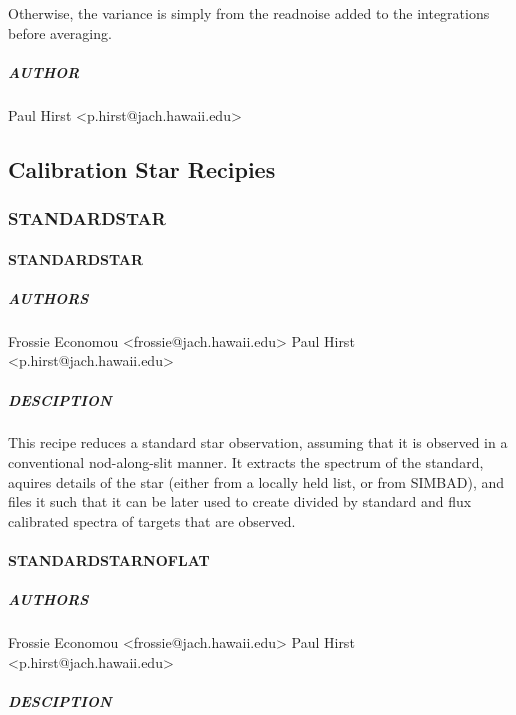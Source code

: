 \documentclass[twoside,11pt]{article}
\renewcommand{\_}{\texttt{\symbol{95}}}
\begin{document}
Otherwise, the variance is simply from the readnoise added to the integrations
before averaging.

\subparagraph*{AUTHOR\label{_REDUCE_BIAS__AUTHOR}}

Paul Hirst <p.hirst@jach.hawaii.edu>



\subsection{Calibration Star Recipies}

\subsubsection{STANDARD\_STAR}
\paragraph*{STANDARD\_STAR\label{STANDARD_STAR}}



\subparagraph*{AUTHORS\label{STANDARD_STAR_AUTHORS}}

Frossie Economou <frossie@jach.hawaii.edu>
Paul Hirst <p.hirst@jach.hawaii.edu>

\subparagraph*{DESCIPTION\label{STANDARD_STAR_DESCIPTION}}

This recipe reduces a standard star observation, assuming that it is
observed in a conventional nod-along-slit manner. It extracts the
spectrum of the standard, aquires details of the star (either from a
locally held list, or from SIMBAD), and files it such that it can be
later used to create divided by standard and flux calibrated spectra
of targets that are observed.

\paragraph*{STANDARD\_STAR\_NOFLAT\label{STANDARD_STAR_NOFLAT}}



\subparagraph*{AUTHORS\label{STANDARD_STAR_NOFLAT_AUTHORS}}

Frossie Economou <frossie@jach.hawaii.edu>
Paul Hirst <p.hirst@jach.hawaii.edu>

\subparagraph*{DESCIPTION\label{STANDARD_STAR_NOFLAT_DESCIPTION}}
\end{document}
